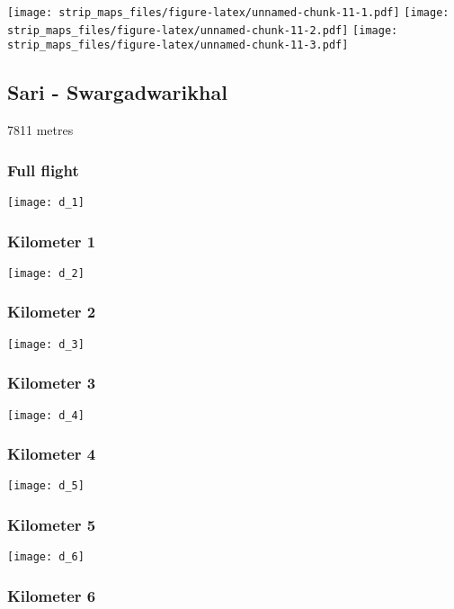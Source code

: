 \documentclass[]{article}
\begin{document}
\texttt{[image: strip\_maps\_files/figure-latex/unnamed-chunk-11-1.pdf]}
\texttt{[image: strip\_maps\_files/figure-latex/unnamed-chunk-11-2.pdf]}
\texttt{[image: strip\_maps\_files/figure-latex/unnamed-chunk-11-3.pdf]}

\newpage

\subsection{Sari - Swargadwarikhal}\label{sari---swargadwarikhal}

7811 metres

\subsubsection{Full flight}\label{full-flight-3}

\texttt{[image: d\_1]}

\subsubsection{Kilometer 1}\label{kilometer-1-3}

\texttt{[image: d\_2]}

\subsubsection{Kilometer 2}\label{kilometer-2-3}

\texttt{[image: d\_3]}

\subsubsection{Kilometer 3}\label{kilometer-3-3}

\texttt{[image: d\_4]}

\subsubsection{Kilometer 4}\label{kilometer-4-3}

\texttt{[image: d\_5]}

\subsubsection{Kilometer 5}\label{kilometer-5-3}

\texttt{[image: d\_6]}

\subsubsection{Kilometer 6}\label{kilometer-6-3}
\end{document}
